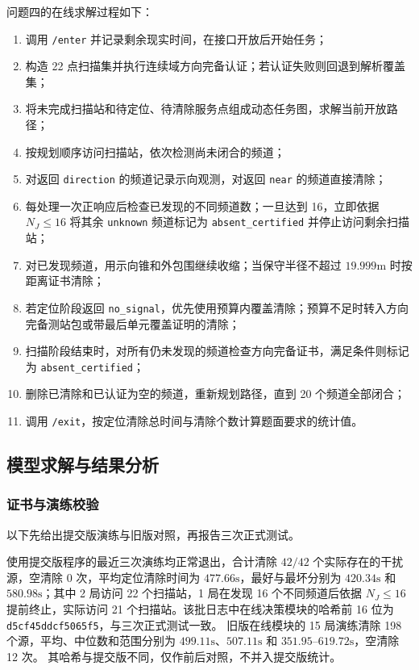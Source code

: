 问题四的在线求解过程如下：

\begin{enumerate}
\item 调用 \texttt{/enter} 并记录剩余现实时间，在接口开放后开始任务；
\item 构造 22 点扫描集并执行连续域方向完备认证；若认证失败则回退到解析覆盖集；
\item 将未完成扫描站和待定位、待清除服务点组成动态任务图，求解当前开放路径；
\item 按规划顺序访问扫描站，依次检测尚未闭合的频道；
\item 对返回 \texttt{direction} 的频道记录示向观测，对返回 \texttt{near} 的频道直接清除；
\item 每处理一次正响应后检查已发现的不同频道数；一旦达到 16，立即依据 $N_J\le16$ 将其余 \texttt{unknown} 频道标记为 \texttt{absent\_certified} 并停止访问剩余扫描站；
\item 对已发现频道，用示向锥和外包围继续收缩；当保守半径不超过 $19.999\mathrm{m}$ 时按距离证书清除；
\item 若定位阶段返回 \texttt{no\_signal}，优先使用预算内覆盖清除；预算不足时转入方向完备测站包或带最后单元覆盖证明的清除；
\item 扫描阶段结束时，对所有仍未发现的频道检查方向完备证书，满足条件则标记为 \texttt{absent\_certified}；
\item 删除已清除和已认证为空的频道，重新规划路径，直到 20 个频道全部闭合；
\item 调用 \texttt{/exit}，按定位清除总时间与清除个数计算题面要求的统计值。
\end{enumerate}

\subsection{模型求解与结果分析}

\subsubsection{证书与演练校验}

以下先给出提交版演练与旧版对照，再报告三次正式测试。

使用提交版程序的最近三次演练均正常退出，合计清除 $42/42$ 个实际存在的干扰源，空清除 0 次，平均定位清除时间为 $477.66\mathrm{s}$，最好与最坏分别为 $420.34\mathrm{s}$ 和 $580.98\mathrm{s}$；其中 2 局访问 22 个扫描站，1 局在发现 16 个不同频道后依据 $N_J\le16$ 提前终止，实际访问 21 个扫描站。该批日志中在线决策模块的哈希前 16 位为 \texttt{d5cf45ddcf5065f5}，与三次正式测试一致。
旧版在线模块的 15 局演练清除 198 个源，平均、中位数和范围分别为 $499.11\mathrm{s}$、$507.11\mathrm{s}$ 和 $351.95$--$619.72\mathrm{s}$，空清除 12 次。
其哈希与提交版不同，仅作前后对照，不并入提交版统计。

